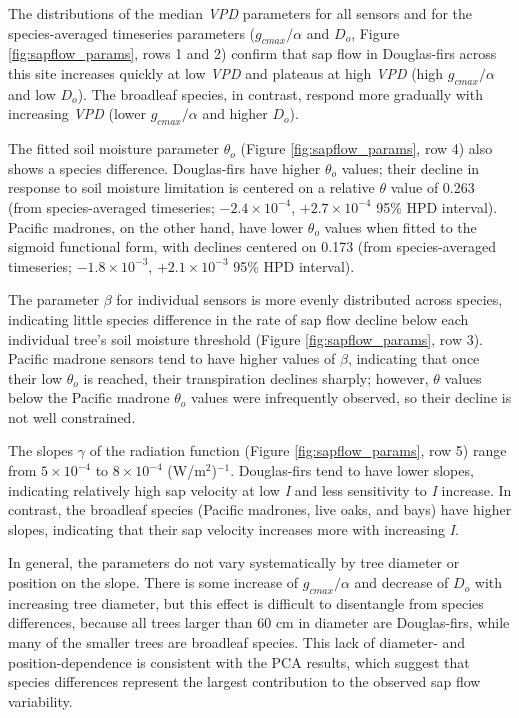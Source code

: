 The distributions of the median \textit{VPD} parameters for all sensors and for the species-averaged timeseries parameters ($g_{cmax}/\alpha$ and $D_o$, Figure \ref{fig:sapflow_params}, rows 1 and 2) confirm that sap flow in Douglas-firs across this site increases quickly at low \textit{VPD} and plateaus at high \textit{VPD} (high $g_{cmax}/\alpha$ and low $D_o$).  The broadleaf species, in contrast, respond more gradually with increasing \textit{VPD} (lower $g_{cmax}/\alpha$ and higher $D_o$).

The fitted soil moisture parameter $\theta_o$ (Figure \ref{fig:sapflow_params}, row 4) also shows a species difference.  Douglas-firs have higher $\theta_o$ values; their decline in response to soil moisture limitation is centered on a relative $\theta$ value of 0.263 (from species-averaged timeseries;  $-2.4 \times 10^{-4}$, $+2.7 \times 10^{-4}$ 95\% HPD interval).  Pacific madrones, on the other hand, have lower $\theta_o$ values when fitted to the sigmoid functional form, with declines centered on 0.173 (from species-averaged timeseries; $-1.8 \times 10^{-3}$, $+2.1 \times 10^{-3}$ 95\% HPD interval).

The parameter $\beta$ for individual sensors is more evenly distributed across species, indicating little species difference in the rate of sap flow decline below each individual tree's soil moisture threshold (Figure \ref{fig:sapflow_params}, row 3).  Pacific madrone sensors tend to have higher values of $\beta$, indicating that once their low $\theta_o$ is reached, their transpiration declines sharply; however, $\theta$ values below the Pacific madrone $\theta_o$ values were infrequently observed, so their decline is not well constrained.

The slopes $\gamma$ of the radiation function (Figure \ref{fig:sapflow_params}, row 5) range from $5 \times 10^{-4}$ to $8 \times 10^{-4}$ (W/m$^2$)$^{-1}$.  Douglas-firs tend to have lower slopes, indicating relatively high sap velocity at low \textit{I} and less sensitivity to \textit{I} increase.  In contrast, the broadleaf species (Pacific madrones, live oaks, and bays) have higher slopes, indicating that their sap velocity increases more with increasing \textit{I}.

In general, the parameters do not vary systematically by tree diameter or position on the slope.  There is some increase of $g_{cmax}/\alpha$ and decrease of $D_o$ with increasing tree diameter, but this effect is difficult to disentangle from species differences, because all trees larger than 60 cm in diameter are Douglas-firs, while many of the smaller trees are broadleaf species.  This lack of diameter- and position-dependence is consistent with the PCA results, which suggest that species differences represent the largest contribution to the observed sap flow variability.

